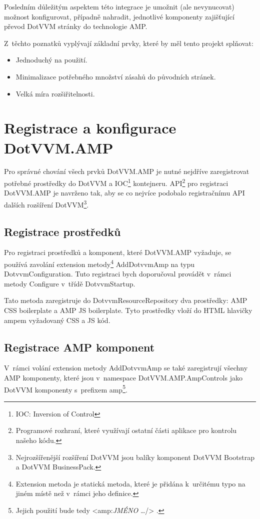 Posledním důležitým aspektem této integrace je umožnit (ale nevynucovat) možnost konfigurovat, případně nahradit, jednotlivé komponenty zajišťující převod DotVVM stránky do technologie AMP.

Z~těchto poznatků vyplývají základní prvky, které by měl tento projekt splňovat:
\begin{itemize}
\item Jednoduchý na použití.
\item Minimalizace potřebného množství zásahů do původních stránek.
\item Velká míra rozšiřitelnosti.
\end{itemize}

\section{Registrace a konfigurace DotVVM.AMP}
Pro správné chování všech prvků DotVVM.AMP je nutné nejdříve zaregistrovat potřebné prostředky do DotVVM a IOC\footnote{IOC: Inversion of Control} kontejneru. API\footnote{Programové rozhraní, které využívají ostatní části aplikace pro kontrolu našeho kódu.} pro registraci DotVVM.AMP je navrženo tak, aby se co nejvíce podobalo registračnímu API dalších rozšíření DotVVM\footnote{Nejrozšířenější rozšíření DotVVM jsou balíky komponent DotVVM Bootstrap a DotVVM BusinessPack.}.

\subsection*{Registrace prostředků}
Pro registraci prostředků a komponent, které DotVVM.AMP vyžaduje, se používá zavolání extension metody\footnote{\label{extension}Extension metoda je statická metoda, které je přidána k~určitému typo na jiném místě než v~rámci jeho definice.} AddDotvvmAmp na typu DotvvmConfiguration. Tuto registraci bych doporučoval provádět v~rámci metody Configure v~třídě DotvvmStartup.

Tato metoda zaregistruje do DotvvmResourceRepository dva prostředky: AMP CSS boilerplate a AMP JS boilerplate. Tyto prostředky vloží do HTML hlavičky ampem vyžadovaný CSS a JS kód.

\subsection*{Registrace AMP komponent}
V~rámci volání extension metody AddDotvvmAmp se také zaregistrují všechny AMP komponenty, které jsou v~namespace DotVVM.AMP.AmpControls jako DotVVM komponenty s~prefixem amp\footnote{Jejich použití bude tedy <amp:\textit{JMÉNO} \ldots /> . }.


